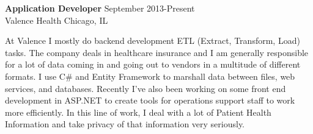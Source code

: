 \textbf{Application Developer} \hfill September 2013-Present \\
Valence Health \hfill Chicago, IL
\begin{description}  \itemsep -2pt %
\item At Valence I mostly do backend development ETL (Extract,
Transform, Load) tasks. The company deals in healthcare insurance and I
am generally responsible for a lot of data coming in and going out to
vendors in a multitude of different formats. I use C\# and Entity
Framework to marshall data between files, web services, and databases.
Recently I've also been working on some front end development in ASP.NET
to create tools for operations support staff to work more efficiently.
In this line of work, I deal with a lot of Patient Health Information
and take privacy of that information very seriously.
\end{description}
